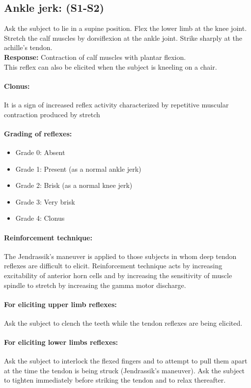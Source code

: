 \documentclass[a4paper,12pt]{book}
\begin{document}
\subsection*{Ankle jerk: (S1-S2)}
Ask the subject to lie in a supine position. Flex the lower limb at the knee joint. Stretch the calf muscles by dorsiflexion at the ankle joint. Strike sharply at the achille's tendon.\\
\textbf{Response:} Contraction of calf muscles with plantar flexion.\\
This reflex can also be elicited when the subject is kneeling on a chair.\\
\paragraph{Clonus:}
It is a sign of increased reflex activity characterized by repetitive muscular contraction produced by stretch
\paragraph{Grading of reflexes:}
\begin{itemize}
\item[]Grade 0: Absent
\item[]Grade 1: Present (as a normal ankle jerk)
\item[]Grade 2: Brisk (as a normal knee jerk)
\item[]Grade 3: Very brisk
\item[]Grade 4: Clonus
\end{itemize}
\paragraph{Reinforcement technique:}
The Jendrassik's maneuver is applied to those subjects in whom deep tendon reflexes are difficult to elicit. Reinforcement technique acts by increasing excitability of anterior horn cells and by increasing the sensitivity of muscle spindle to stretch by increasing the gamma motor discharge.
\paragraph{For eliciting upper limb reflexes:}
	Ask the subject to clench the teeth while the tendon reflexes are being elicited.
\paragraph{For eliciting lower limbs reflexes:}
Ask the subject to interlock the flexed fingers and to attempt to pull them apart at the time the tendon is being struck (Jendrassik's maneuver). Ask the subject to tighten immediately before striking the tendon and to relax thereafter.
\end{document}
